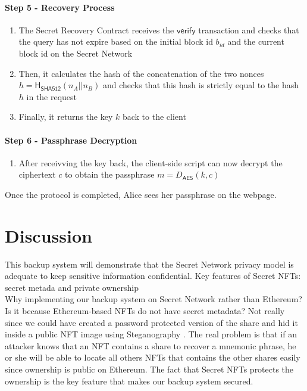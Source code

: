 \documentclass[12pt]{article}
\newcommand{\ms}[1]{\ensuremath{\mathsf{#1}}}
\begin{document}
\paragraph{Step 5 - Recovery Process}

\begin{enumerate}[label=5.\arabic*]
    \item The Secret Recovery Contract receives the $\ms{verify}$ transaction and checks that the query has not expire based on the initial block id $b_{id}$ and the current block id on the Secret Network
  \item Then, it calculates the hash of the concatenation of the two nonces $h=\ms{H_{\ms{SHA512}}}(n_A || n_B)$ and checks that this hash is strictly equal to the hash $h$ in the request
  \item Finally, it returns the key $k$ back to the client
\end{enumerate}

\paragraph{Step 6 - Passphrase Decryption}

\begin{enumerate}[label=6.\arabic*]
  \item After receivving the key back, the client-side script can now decrypt the ciphertext $c$ to obtain the passphrase $m=D_{\ms{AES}}(k, c)$
\end{enumerate}

Once the protocol is completed, Alice sees her passphrase on the webpage.

\section{Discussion}

This backup system will demonstrate that the Secret Network privacy model is adequate to keep sensitive information confidential. Key features of Secret NFTs: secret metada and private ownership \\ 

Why implementing our backup system on Secret Network rather than Ethereum? Is it because Ethereum-based NFTs do not have secret metadata? Not really since we could have created a password protected version of the share and hid it inside a public NFT image using Steganography \cite{Steganography}. The real problem is that if an attacker knows that an NFT contains a share to recover a mnemonic phrase, he or she will be able to locate all others NFTs that contains the other shares easily since ownership is public on Ethereum. The fact that Secret NFTs protects the ownership is the key feature that makes our backup system secured. 
\end{document}
